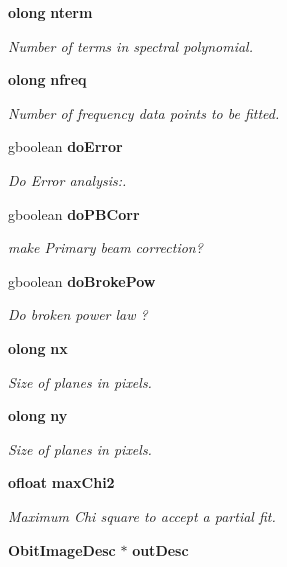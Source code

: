 \begin{CompactItemize}
{\bf olong} {\bf nterm}
\begin{CompactList}\small\item\em Number of terms in spectral polynomial. \item\end{CompactList}\item 
{\bf olong} {\bf nfreq}
\begin{CompactList}\small\item\em Number of frequency data points to be fitted. \item\end{CompactList}\item 
gboolean {\bf do\-Error}
\begin{CompactList}\small\item\em Do Error analysis:. \item\end{CompactList}\item 
gboolean {\bf do\-PBCorr}
\begin{CompactList}\small\item\em make Primary beam correction? \item\end{CompactList}\item 
gboolean {\bf do\-Broke\-Pow}
\begin{CompactList}\small\item\em Do broken power law ? \item\end{CompactList}\item 
{\bf olong} {\bf nx}
\begin{CompactList}\small\item\em Size of planes in pixels. \item\end{CompactList}\item 
{\bf olong} {\bf ny}
\begin{CompactList}\small\item\em Size of planes in pixels. \item\end{CompactList}\item 
{\bf ofloat} {\bf max\-Chi2}
\begin{CompactList}\small\item\em Maximum Chi square to accept a partial fit. \item\end{CompactList}\item 
{\bf Obit\-Image\-Desc} $\ast$ {\bf out\-Desc}

\end{CompactItemize}
